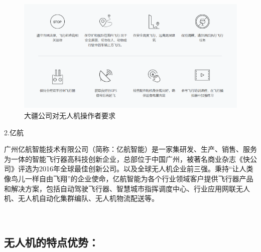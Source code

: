 \documentclass{article}
\begin{document}
\par
\begin{figure}[h!]
\centering
\includegraphics[scale=0.5]{2}
\caption{大疆公司对无人机操作者要求}
\label{fig:2}
\end{figure}








2.亿航\par
广州亿航智能技术有限公司（简称：亿航智能）是一家集研发、生产、销售、服务为一体的智能飞行器高科技创新企业，总部位于中国广州，被著名商业杂志《快公司》评选为2016年全球最佳创新公司。以及全球无人机企业前三强。秉持“让人类像鸟儿一样自由飞翔”的企业使命，亿航智能为各个行业领域客户提供飞行器产品和解决方案，包括自动驾驶飞行器、智慧城市指挥调度中心、行业应用网联无人机、无人机自动化集群编队、无人机物流配送等。\par
\subsection{无人机的特点优势：\citep{4}}
\end{document}
